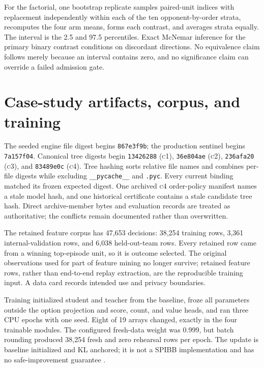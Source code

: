 \documentclass[aps,reprint,superscriptaddress,longbibliography,floatfix]{revtex4-2}
\newcommand{\COne}{\textsc{c1}}
\newcommand{\CTwo}{\textsc{c2}}
\newcommand{\CThree}{\textsc{c3}}
\newcommand{\CFour}{\textsc{c4}}
\begin{document}
For the factorial, one bootstrap replicate samples paired-unit indices with
replacement independently within each of the ten opponent-by-order strata,
recomputes the four arm means, forms each contrast, and averages strata equally.
The interval is the 2.5 and 97.5 percentiles.  Exact McNemar inference for the
primary binary contrast conditions on discordant directions.  No equivalence
claim follows merely because an interval contains zero, and no significance
claim can override a failed admission gate.

\section{Case-study artifacts, corpus, and training}

The seeded engine file digest begins \texttt{867e3f9b}; the production sentinel
begins \texttt{7a157f04}.  Canonical tree digests begin
\texttt{13426288} (\COne), \texttt{36e804ae} (\CTwo),
\texttt{236afa20} (\CThree), and \texttt{83489e0c} (\CFour).  Tree hashing sorts
relative file names and combines per-file digests while excluding
\texttt{\_\_pycache\_\_} and \texttt{.pyc}.  Every current binding matched its
frozen expected digest.  One archived \CFour{} order-policy manifest names a
stale model hash, and one historical certificate contains a stale candidate
tree hash.  Direct archive-member bytes and evaluation records are treated as
authoritative; the conflicts remain documented rather than overwritten.

The retained feature corpus has 47,653 decisions: 38,254 training rows, 3,361
internal-validation rows, and 6,038 held-out-team rows.  Every retained row came
from a winning top-episode unit, so it is outcome selected.  The original
observations used for part of feature mining no longer survive; retained
feature rows, rather than end-to-end replay extraction, are the reproducible
training input.  A data card records intended use and privacy boundaries.



Training initialized student and teacher from the baseline, froze all parameters
outside the option projection and score, count, and value heads, and ran three
CPU epochs with one seed.  Eight of 19 arrays changed, exactly in the four
trainable modules.  The configured fresh-data weight was 0.999, but batch
rounding produced 38,254 fresh and zero rehearsal rows per epoch.  The update is
baseline initialized and KL anchored; it is not a SPIBB implementation and has
no safe-improvement guarantee \cite{laroche2019spibb}.
\end{document}
